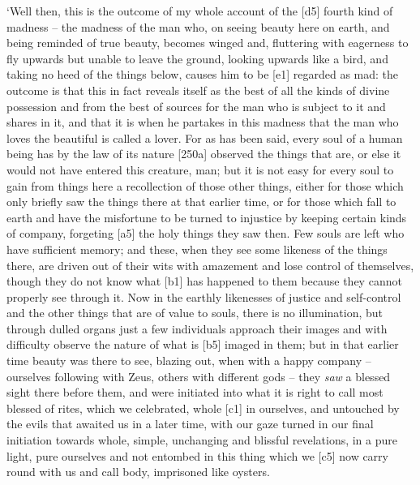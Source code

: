 ‘Well then, this is the outcome of my whole account of the {[}d5{]}
fourth kind of madness -- the madness of the man who, on seeing beauty
here on earth, and being reminded of true beauty, becomes winged and,
fluttering with eagerness to fly upwards but unable to leave the ground,
looking upwards like a bird, and taking no heed of the things below,
causes him to be {[}e1{]} regarded as
mad: the outcome is that
this in fact reveals itself as the best of all the kinds of divine
possession and from the best of sources for the man who is subject to it
and shares in it, and that it is when he partakes in this madness that
the man who loves the
beautiful is called a
lover. For as has been said, every soul of a human being has by the law
of its nature {[}250a{]} observed the things that are, or else it would
not have entered this creature, man; but it is not easy for every soul
to gain from things here a recollection of those other things, either
for those which only briefly saw the things there at that earlier time,
or for those which fall to earth and have the misfortune to be turned to
injustice by keeping certain kinds of company, forgeting {[}a5{]} the
holy things they saw then. Few souls are left who have sufficient
memory; and these, when they see some likeness of the things there, are
driven out of their wits with amazement and lose control of themselves,
though they do not know what {[}b1{]} has happened to them because they
cannot properly see through it. Now in the earthly likenesses of justice
and self-control and the other things that are of value to souls, there
is no illumination, but through dulled organs just a few individuals
approach their images and with difficulty observe the nature of what is
{[}b5{]} imaged in them; but in that earlier time beauty was there to
see, blazing out, when with a happy company --
ourselves following with
Zeus, others with different gods -- they {\em saw} a blessed sight there
before them, and were initiated into what it is right to call most
blessed of rites, which we celebrated, whole {[}c1{]} in ourselves, and
untouched by the evils that awaited us in a later time, with our gaze
turned in our final initiation towards whole, simple, unchanging and
blissful revelations, in a pure light, pure ourselves and not entombed
in this thing which we {[}c5{]} now carry round with us and call body,
imprisoned like oysters.

